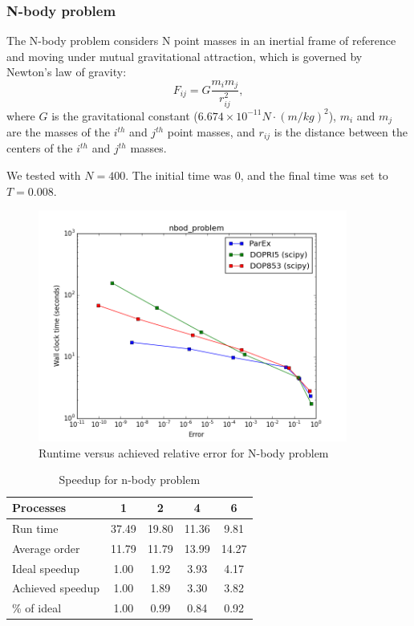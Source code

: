 \documentclass[12pt]{article}
\begin{document}
\subsubsection{N-body problem}
The N-body problem considers N point masses in an inertial frame of reference and moving under mutual gravitational attraction, which is governed by Newton's law of gravity:
$$F_{ij} = G\frac{m_i m_j}{r_{ij}^2},$$
where $G$ is the gravitational constant ($6.674 \times 10^{-11} N \cdot (m/kg)^2$), $m_i$ and $m_j$ are the masses of the $i^{th}$ and $j^{th}$ point masses, and $r_{ij}$ is the distance between the centers of the $i^{th}$ and $j^{th}$ masses.

We tested with $N = 400$. The initial time was 0, and the final time was set to $T = 0.008$.
\begin{figure}[h]
 \includegraphics[width=4in]{images/nbod_problem_err_vs_time.png}
\centering
\caption{Runtime versus achieved relative error for N-body problem}
\end{figure} 

\begin{table}
\caption{Speedup for n-body problem\label{tbl:nbody}}{
\begin{tabular}{lcccc}\\
Processes & 1 & 2 & 4 & 6\\ \hline
Run time & 37.49 & 19.80 & 11.36 &  9.81 \\
Average order & 11.79 & 11.79 & 13.99 & 14.27 \\
Ideal speedup &  1.00 &  1.92 &  3.93 &  4.17 \\
Achieved speedup &  1.00 &  1.89 &  3.30 &  3.82 \\
\% of ideal &  1.00 &  0.99 &  0.84 &  0.92 \\ \hline
\end{tabular}}
\end{table}
\end{document}
